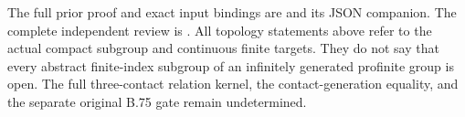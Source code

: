 \begingroup\footnotesize\raggedright
The full prior proof and exact input bindings are
and its JSON companion. The complete independent review is
.
All topology statements above refer to the actual compact subgroup
and continuous finite targets. They do not say that every abstract
finite-index subgroup of an infinitely generated profinite group is
open. The full three-contact relation kernel, the contact-generation
equality, and the separate original B.75 gate remain undetermined.
\par\endgroup
